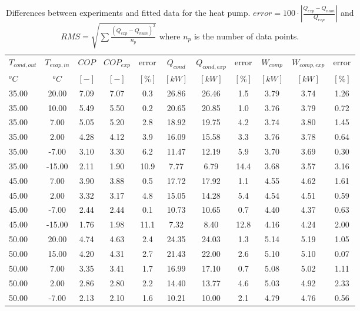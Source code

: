 \documentclass[english]{SPFShortReport}
\begin{document}
\begin{table}[!ht]
\begin{small}
\caption{Differences between experiments and fitted data for the heat pump.          $error=100 \cdot |\frac{Q_{exp}-Q_{num}}{Q_{exp}}|$ and $RMS = \sqrt { \sum{\frac{(Q_{exp}-Q_{num})^2}{n_p}} }$ where $n_p$ is the number of data points.}
\begin{center}
\resizebox{12cm}{!} 
{
\begin{tabular}{l | c c c c c c c c c c } 
\hline
\hline
$T_{cond,out}$ &$T_{evap,in}$ &$COP$ &$COP_{exp}$ &error &$Q_{cond}$ &$Q_{cond,exp}$ &error &$W_{comp}$ &$W_{comp,exp}$ &error \\ 
$^oC$ &$^oC$ &$[-]$ &$[-]$ &$[\%]$ &$[kW]$ &$[kW]$ &$[\%]$ &$[kW]$ &$[kW]$ &$[\%]$\\ 
\hline
35.00  & 20.00 & 7.09 & 7.07 & 0.3 & 26.86 & 26.46 & 1.5 & 3.79 & 3.74 & 1.26\\ 
35.00  & 10.00 & 5.49 & 5.50 & 0.2 & 20.65 & 20.85 & 1.0 & 3.76 & 3.79 & 0.72\\ 
35.00  & 7.00 & 5.05 & 5.20 & 2.8 & 18.92 & 19.75 & 4.2 & 3.74 & 3.80 & 1.45\\ 
35.00  & 2.00 & 4.28 & 4.12 & 3.9 & 16.09 & 15.58 & 3.3 & 3.76 & 3.78 & 0.64\\ 
35.00  & -7.00 & 3.10 & 3.30 & 6.2 & 11.47 & 12.19 & 5.9 & 3.70 & 3.69 & 0.30\\ 
35.00  & -15.00 & 2.11 & 1.90 & 10.9 & 7.77 & 6.79 & 14.4 & 3.68 & 3.57 & 3.16\\ 
45.00  & 7.00 & 3.90 & 3.88 & 0.5 & 17.72 & 17.92 & 1.1 & 4.55 & 4.62 & 1.61\\ 
45.00  & 2.00 & 3.32 & 3.17 & 4.8 & 15.05 & 14.28 & 5.4 & 4.54 & 4.51 & 0.59\\ 
45.00  & -7.00 & 2.44 & 2.44 & 0.1 & 10.73 & 10.65 & 0.7 & 4.40 & 4.37 & 0.63\\ 
45.00  & -15.00 & 1.76 & 1.98 & 11.1 & 7.32 & 8.40 & 12.8 & 4.16 & 4.24 & 2.00\\ 
50.00  & 20.00 & 4.74 & 4.63 & 2.4 & 24.35 & 24.03 & 1.3 & 5.14 & 5.19 & 1.05\\ 
50.00  & 15.00 & 4.20 & 4.31 & 2.7 & 21.43 & 22.00 & 2.6 & 5.10 & 5.10 & 0.07\\ 
50.00  & 7.00 & 3.35 & 3.41 & 1.7 & 16.99 & 17.10 & 0.7 & 5.08 & 5.02 & 1.11\\ 
50.00  & 2.00 & 2.86 & 2.80 & 2.2 & 14.40 & 13.77 & 4.6 & 5.03 & 4.92 & 2.33\\ 
50.00  & -7.00 & 2.13 & 2.10 & 1.6 & 10.21 & 10.00 & 2.1 & 4.79 & 4.76 & 0.56\\ 

\end{tabular}}
\end{center}
\end{small}
\end{table}
\end{document}
